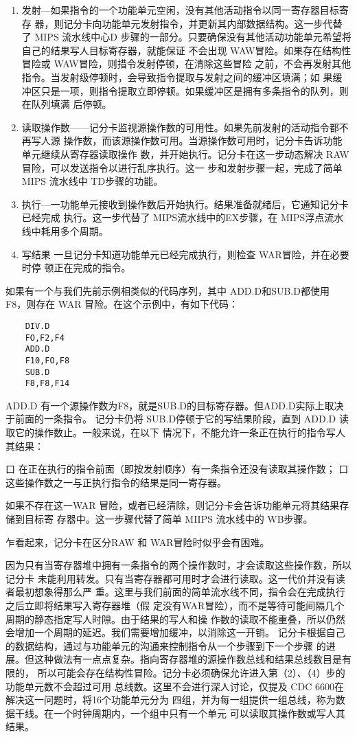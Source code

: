 \begin{enumerate}
    \item 发射—如果指令的一个功能单元空闲，没有其他活动指令以同一寄存器目标寄存
    器，则记分卡向功能单元发射指令，并更新其内部数据结构。这一步代替了 MIPS 流水线中心D
    步骤的一部分。只要确保没有其他活动功能单元希望将自己的结果写人目标寄存器，就能保证
    不会出现 WAW冒险。如果存在结构性冒险或 WAW冒险，则措令发射停顿，在清除这些冒险
    之前，不会再发射其他指令。当发射级停顿时，会导致指令提取与发射之间的缓冲区填满；如
    果缓冲区只是一项，则指令提取立即停顿。如果缓冲区是拥有多条指令的队列，则在队列填满
    后停顿。
    \item 读取操作数——记分卡监视源操作数的可用性。如果先前发射的活动指令都不再写人源
    操作数，而该源操作数可用。当源操作数可用时，记分卡告诉功能单元继续从寄存器读取操作
    数，并开始执行。记分卡在这一步动态解决 RAW 冒险，可以发送指令以进行乱序执行。这一
    步和发射步骤一起，完成了简单 MIPS 流水线中 TD步骤的功能。
    \item 执行—一功能单元接收到操作数后开始执行。结果准备就绪后，它通知记分卡已经完成
    执行。这一步代替了 MIPS流水线中的EX步骤，在 MIPS浮点流水线中耗用多个周期。
    \item 写结果 一旦记分卡知道功能单元已经完成执行，则检查 WAR冒险，并在必要时停
    顿正在完成的指令。
\end{enumerate}

如果有一个与我们先前示例相类似的代码序列，其中 ADD.D和SUB.D都使用 F8，则存在 WAR
冒险。在这个示例中，有如下代码：

\begin{verbatim}
    DIV.D
    FO,F2,F4
    ADD.D
    F10,FO,F8
    SUB.D
    F8,F8,F14
\end{verbatim}
ADD.D 有一个源操作数为F8，就是SUB.D的目标寄存器。但ADD.D实际上取决于前面的一条指令。
记分卡仍将 SUB.D停顿于它的写结果阶段，直到 ADD.D 读取它的操作数止。一般来说，在以下
情况下，不能允许一条正在执行的指令写人其结果：

口 在正在执行的指令前面（即按发射顺序）有一条指令还没有读取其操作数；
口 这些操作数之一与正执行指令的结果是同一寄存器。

如果不存在这一WAR 冒险，或者已经清除，则记分卡会告诉功能单元将其结果存储到目标寄
存器中。这一步骤代替了简单 MIIPS 流水线中的 WB步骤。

乍看起来，记分卡在区分RAW 和 WAR冒险时似乎会有困难。

因为只有当寄存器堆中拥有一条指令的两个操作数时，才会读取这些操作数，所以记分卡
未能利用转发。只有当寄存器都可用时才会进行读取。这一代价并没有读者最初想象得那么严
重。这里与我们前面的简单流水线不同，指令会在完成执行之后立即将结果写入寄存器堆（假
定没有WAR冒险），而不是等待可能间隔几个周期的静态指定写人时隙。由于结果的写人和操
作数的读取不能重叠，所以仍然会增加一个周期的延迟。我们需要增加缓冲，以消除这一开销。
记分卡根据自己的数据结构，通过与功能单元的沟通来控制指令从一个步骤到下一个步骤
的进展。但这种做法有一点点复杂。指向寄存器堆的源操作数总线和结果总线数目是有限的，
所以可能会存在结构性冒险。记分卡必须确保允许进入第（2）、（4）步的功能单元数不会超过可用
总线数。这里不会进行深人讨论，仅提及 CDC 6600在解决这一问题时，将16个功能单元分为
四组，并为每一组提供一组总线，称为数据干线。在一个时钟周期内，一个组中只有一个单元
可以读取其操作数或写人其结果。

